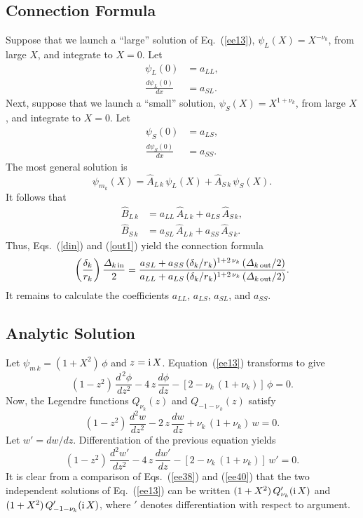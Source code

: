 \documentclass[12pt,prb,aps]{revtex4-1}
\begin{document}
\subsection{Connection Formula}
Suppose that we launch a  ``large''  solution  of Eq.~(\ref{ee13}), $\psi_L(X) = X^{-\nu_k}$, 
from large $X$, and integrate to $X=0$. Let
\begin{align}
\psi_L(0) &= a_{LL},\\[0.5ex]
\frac{d\psi_L(0)}{dx} &= a_{SL}.
\end{align}
Next, suppose that we launch a  ``small'' solution, 
$\psi_S(X) = X^{1+\nu_k}$, 
from large $X$, and integrate to  $X=0$. Let
\begin{align}
\psi_S(0) &= a_{LS},\\[0.5ex]
\frac{d\psi_S(0)}{dx} &= a_{SS}.
\end{align}
The most general solution is
\begin{equation}
\psi_{m_k}(X) = \hat{A}_{L\,k}\,\psi_L(X)+ \hat{A}_{S\,k}\,\psi_S(X).
\end{equation}
It follows that
\begin{align}\label{bin}
\hat{B}_{L\,k} &= a_{LL}\,\hat{A}_{L\,k} + a_{LS}\,\hat{A}_{S\,k},\\[0.5ex]
\hat{B}_{S\,k}&= a_{SL}\,\hat{A}_{L\,k} + a_{SS}\,\hat{A}_{S\,k}.\label{bout}
\end{align}
Thus,  Eqs.~(\ref{din}) and (\ref{out1}) yield the connection formula
\begin{equation}\label{ee20}
\left(\frac{\delta_k}{r_k}\right)\frac{{\mit\Delta}_{k \,{\rm in}}}{2}= \frac{a_{SL} +a_{SS}\,(\delta_k/r_k)^{1+2\,\nu_k}\,({\mit\Delta}_{k\,{\rm out}}/2)}
{a_{LL}  +a_{LS}\,(\delta_k/r_k)^{1+2\,\nu_k}\,({\mit\Delta}_{k\,{\rm out}}/2)}.
\end{equation}
It remains to calculate the coefficients $a_{LL}$, $a_{LS}$, $a_{SL}$, and $a_{SS}$. 

\subsection{Analytic Solution}
Let $\psi_{m\,k} = (1+X^2)\,\phi$ and $z={\rm i}\,X$. Equation~(\ref{ee13}) transforms to give 
\begin{equation}\label{ee38}
(1-z^2)\,\frac{d^{\,2}\phi}{dz^2} - 4\,z\,\frac{d\phi}{dz} - [2-\nu_k\,(1+\nu_k)]\,\phi=0.
\end{equation}
Now, the Legendre functions $Q_{\nu_k}(z)$ and $Q_{-1-\nu_{\,k}}(z)$ satisfy\,\cite{abramc}
\begin{equation}
(1-z^2)\,\frac{d^2 w}{dz^2} - 2\,z\,\frac{dw}{dz} + \nu_k\,(1+\nu_k)\,w = 0.
\end{equation}
Let $w'=dw/dz$. Differentiation of the previous equation yields
\begin{equation}\label{ee40}
(1-z^2)\,\frac{d^2w'}{dz^2} - 4\,z\,\frac{dw'}{dz} - [2-\nu_k\,(1+\nu_k)]\,w'=0.
\end{equation}
It is clear from a comparison of Eqs.~(\ref{ee38}) and (\ref{ee40}) that the two independent solutions of Eq.~(\ref{ee13}) can be written 
$(1+X^2)\,Q_{\nu_k}'({\rm i}\,X)$ and $(1+X^2)\,Q_{-1-\nu_k}'({\rm i}\,X)$, where $'$ denotes differentiation with respect to argument. 
\end{document}
